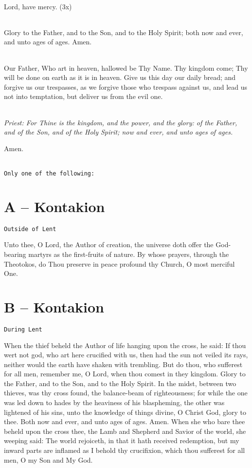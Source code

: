 {\mbox{}\\
Lord, have mercy. (3x) 

\mbox{}\\
Glory to the Father, and to the Son, and to the Holy Spirit;
both now and ever,
and unto ages of ages. Amen. 

\mbox{}\\
Our Father, Who art in heaven, hallowed be Thy Name. Thy kingdom come; 
Thy will be done on earth as it is in heaven. Give us this day our daily bread; 
and forgive us our trespasses,
as we forgive those who trespass against us,
and lead us not into temptation,
but deliver us from the evil one.

\mbox{}\\
\emph{Priest: For Thine is the kingdom, and the power, and the glory:
of the Father, and of the Son, and of the Holy Spirit;
now and ever, and unto ages of ages.} 

Amen. 

\mbox{}\\
\texttt{Only one of the following:}

\section*{A -- Kontakion}
\texttt{Outside of Lent}

Unto thee, O Lord, the Author of creation, the universe doth offer the God-bearing 
martyrs as the first-fruits of nature. By whose prayers, through the Theotokos, do Thou 
preserve in peace profound thy Church, O most merciful One. 



\section*{B -- Kontakion}
\texttt{During Lent}

When the thief beheld the Author of life hanging upon the cross, he said:
If thou wert not god, who art here crucified with us,
then had the sun not veiled its rays,
neither would the earth have shaken with trembling.
But do thou, who sufferest for all men, remember me, 
O Lord, when thou comest in they kingdom. 
Glory to the Father, and to the Son, and to the Holy Spirit. 
In the midst, between two thieves, was thy cross found, the balance-beam of 
righteousness; for while the one was led down to hades by the heaviness of his 
blaspheming, the other was lightened of his sins, unto the knowledge of things divine, O 
Christ God, glory to thee. 
Both now and ever, and unto ages of ages. Amen. 
When she who bare thee beheld upon the cross thee, the Lamb and Shepherd and Savior 
of the world, she weeping said: The world rejoiceth, in that it hath received redemption, 
but my inward parts are inflamed as I behold thy crucifixion, which thou sufferest for all 
men, O my Son and My God.


}
